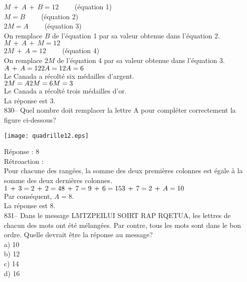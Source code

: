 ﻿\documentclass[letterpaper, 12pt]{article}
\begin{document}
$M\,+\,A\,+\,B=12 \qquad$ (\'equation 1)\\
$M=B \qquad$ (\'equation 2)\\
$2M=A \qquad$ (\'equation 3)\\

On remplace $B$ de l'\'equation 1 par sa valeur obtenue dans l'\'equation
2.\\
$M\,+\,A\,+\,M=12$\\
$2M\,+\,A=12 \qquad$ (\'equation 4)\\

On remplace $2M$ de l'\'equation 4 par sa valeur obtenue dans l'\'equation
3.\\
$A\,+\,A=12\\
2A = 12\\
A=6$\\
Le Canada a r\'ecolt\'e six m\'edailles d'argent.\\

$2M=A\\
2M=6\\
M=3$\\
Le Canada a r\'ecolt\'e trois m\'edailles d'or.\\


La r\'eponse est 3.\\

830-- Quel nombre doit remplacer la lettre A pour compl\'eter correctement
la figure ci-dessous?\\
    \begin{center}
    \texttt{[image: quadrille12.eps]}
    \end{center}


R\'eponse : 8\\

R\'etroaction : \\
Pour chacune des rang\'ees, la somme des deux premi\`eres colonnes est
\'egale \`a la somme des deux derni\`eres colonnes.\\
$1\,+\,3=2\,+\,2=4\\
8\,+\,7=9\,+\,6=15\\
3\,+\,7=2\,+\,A=10$\\
Par cons\'equent, $A=8$.\\
La r\'eponse est 8.\\

831-- Dans le message \og LMTZPEILUI SOIRT RAP RQETUA\fg , les
lettres de chacun des mots ont \'et\'e m\'elang\'ees.  Par contre,
tous les mots sont dans le
bon ordre.  Quelle devrait \^etre la r\'eponse au message?\\
a) 10\\
b) 12\\
c) 14\\
d)  16\\
\end{document}
